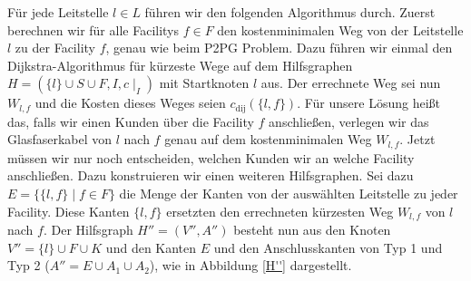 \documentclass[11pt,a4paper]{article}
\theoremstyle{my_th_style1}
\begin{document}
Für jede Leitstelle $l \in L$ führen wir den folgenden Algorithmus durch.
Zuerst berechnen wir für alle Facilitys $f \in F$ den kostenminimalen Weg von der Leitstelle $l$ zu der Facility $f$, genau wie beim P2PG Problem. Dazu führen wir einmal den Dijkstra-Algorithmus für kürzeste Wege auf dem Hilfsgraphen $H=(\{l\} \cup S \cup F , I,c\mid_I)$ mit Startknoten $l$ aus. Der errechnete Weg sei nun $W_{l,f}$ und die Kosten dieses Weges seien $c_{\text{dij}}(\{l,f\})$.
Für unsere Lösung heißt das, falls wir einen Kunden über die Facility $f$ anschließen, verlegen wir das Glasfaserkabel von $l$ nach $f$ genau auf dem kostenminimalen Weg $W_{l,f}$.  Jetzt müssen wir nur noch entscheiden, welchen Kunden wir an welche Facility anschließen.
Dazu konstruieren wir einen weiteren Hilfsgraphen. Sei dazu $E=\{\{l,f  \} \mid f \in F  \}$ die Menge der Kanten von der auswählten Leitstelle zu jeder Facility. Diese Kanten $\{l,f\}$ ersetzten den errechneten kürzesten Weg $W_{l,f}$ von $l$ nach $f$. Der Hilfsgraph $H''=(V'',A'')$ besteht nun aus den Knoten $V''=\{l\} \cup F \cup K$ und den Kanten $E$ und den Anschlusskanten von Typ 1 und Typ 2 ($A''=E \cup A_1 \cup A_2$), wie in Abbildung \ref{H''} dargestellt.
\end{document}
